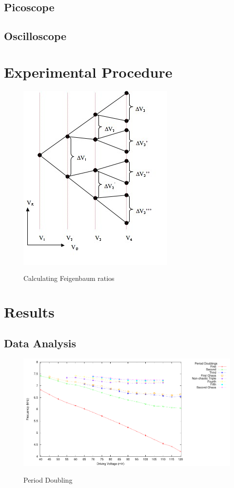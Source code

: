 \documentclass[12pt]{report}
\begin{document}
\section{Picoscope}
\label{sec:Picoscope}


\section{Oscilloscope}
\label{sec:Oscilloscope}


\chapter{Experimental Procedure}


	\begin{figure}
		\centering
		\includegraphics{Pics/Bifurcation Diagram.jpg}
		\label{fig: Calculating Feigenbaum ratios}
		\caption{Calculating Feigenbaum ratios}
	\end{figure}
\chapter{Results}

\section{Data Analysis} %
\label{sec:Data Analysis}

	\begin{figure}[h]
		\centering
		\includegraphics{plots/general.pdf}
		\label{fig:periodDoubling}
		\caption{Period Doubling}
	\end{figure}
\end{document}
